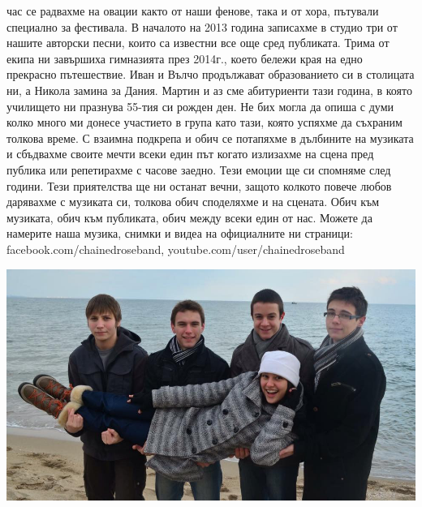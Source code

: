 \begin{multicols}{3}
час се радвахме на овации както от наши фенове, така и от хора, пътували специално за фестивала. В началото на 2013 година записахме в студио три от нашите авторски песни, които са известни все още сред публиката. Трима от екипа ни завършиха гимназията през 2014г., което бележи края на едно прекрасно пътешествие. Иван и Вълчо продължават образованието си в столицата ни, а Никола замина за Дания. Мартин и аз сме абитуриенти тази година, в която училището ни празнува 55-тия си рожден ден. 
Не бих могла да опиша с думи колко много ми донесе участието в група като тази, която успяхме да съхраним толкова време. С взаимна подкрепа и обич се потапяхме в дълбините на музиката и сбъдвахме своите мечти всеки един път когато излизахме на сцена пред публика или репетирахме с часове заедно. Тези емоции ще си спомняме след години. Тези приятелства ще ни останат вечни, защото колкото 
повече любов дарявахме с музиката си, толкова обич споделяхме и на сцената. Обич към музиката, обич към публиката, обич между всеки един от нас. 
Можете да намерите наша музика, снимки и видеа на официалните ни страници: 
facebook.com/chainedroseband, 
\small{youtube.com/user/chainedroseband}
\end{multicols}

\begin{center}
\includegraphics[width=5.7in]{./Chained_Rose/CR.jpg}
\end{center}

\closearticle
